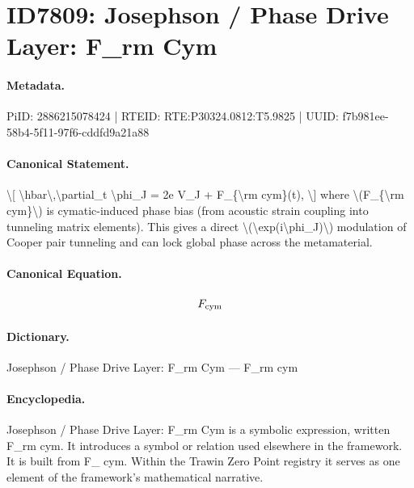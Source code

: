 \section*{ID7809: Josephson / Phase Drive Layer: F\_rm Cym}
\paragraph{Metadata.}
PiID: 2886215078424 | RTEID: RTE:P30324.0812:T5.9825 | UUID: f7b981ee-58b4-5f11-97f6-cddfd9a21a88

\paragraph{Canonical Statement.}
\textbackslash{}[ \textbackslash{}hbar\textbackslash{},\textbackslash{}partial\_t \textbackslash{}phi\_J = 2e V\_J + F\_\{\textbackslash{}rm cym\}(t), \textbackslash{}] where \textbackslash{}(F\_\{\textbackslash{}rm cym\}\textbackslash{}) is cymatic-induced phase bias (from acoustic strain coupling into tunneling matrix elements). This gives a direct \textbackslash{}(\textbackslash{}exp(i\textbackslash{}phi\_J)\textbackslash{}) modulation of Cooper pair tunneling and can lock global phase across the metamaterial.

\paragraph{Canonical Equation.}
\[
F_{\rm cym}
\]

\paragraph{Dictionary.}
Josephson / Phase Drive Layer: F\_rm Cym — F\_rm cym

\paragraph{Encyclopedia.}
Josephson / Phase Drive Layer: F\_rm Cym is a symbolic expression, written F\_rm cym. It introduces a symbol or relation used elsewhere in the framework. It is built from F\_ cym. Within the Trawin Zero Point registry it serves as one element of the framework's mathematical narrative.
